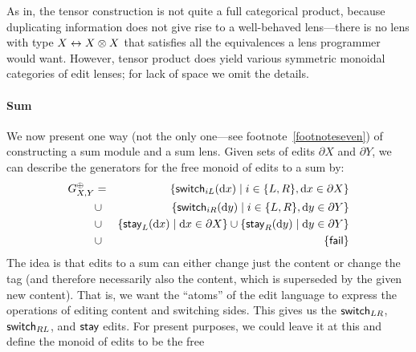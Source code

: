 As in\symmlenses, the tensor construction is not quite a full
categorical product, because duplicating information does not give rise to a
well-behaved lens---there is no lens with type $X \leftrightarrow X \otimes X$ that
satisfies all the equivalences a lens programmer would want.
%
However, tensor product does yield various symmetric monoidal categories
of edit lenses; for lack of space we omit the details. 

\paragraph*{Sum}

We now present one way (not the only one---see footnote~\ref{footnoteseven})
of constructing a sum module and a sum lens.
\iflater
{}\fi
Given sets of edits $\partial X$ and $\partial Y$, we can describe
the generators for the free monoid of edits to a sum by:
\begin{eqnarray*}
    G^\oplus_{X,Y}
    &=&    \{\mathsf{switch}_{iL}(\textrm{d} x) \mid i \in \{L,R\}, \textrm{d} x \in \partial X\} \\
    &\cup& \{\mathsf{switch}_{iR}(\textrm{d} y) \mid i \in \{L,R\}, \textrm{d} y \in \partial Y\} \\
    &\cup& \{\mathsf{stay}_L(\textrm{d} x) \mid \textrm{d} x \in \partial X\} \cup \{\mathsf{stay}_R(\textrm{d} y) \mid \textrm{d} y \in \partial Y\} \\
    &\cup& \{\mathsf{fail}\}
\end{eqnarray*}
The idea is that edits to a sum can either change just the
content or change the tag (and therefore necessarily also the content, which
is superseded by the given new content).  That is, we want the ``atoms'' of
the edit language to express the operations of editing content and switching
sides.  This gives us the $\mathsf{switch}_{LR}$, $\mathsf{switch}_{RL}$, and $\mathsf{stay}$ edits.
%
For present purposes, we could leave it at this and define the monoid of edits to be the free 
